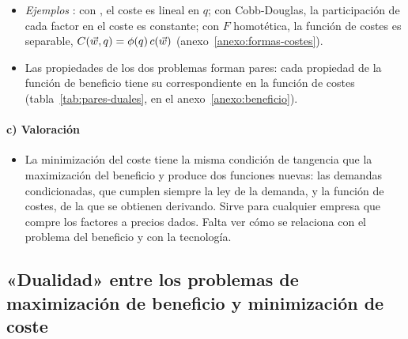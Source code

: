 \documentclass[11pt]{article}
\begin{document}
\begin{itemize}
\begin{enumerate}
\begin{itemize}
    \item tal que $S(\vect{w},q)\,\vect{w}=\vect{0}$, por la homogeneidad de grado cero de $\vect{z}(\vect{w},q)$ en $\vect{w}$ (teorema de ). Con dos factores, la consecuencia es que son necesariamente \emph{sustitutivos netos}: $\partial z_L(\vect{w},q)/\partial w_K\geq 0$.
    \end{itemize}
    Las demostraciones son las mismas que las de la función de gasto y la matriz de  .
  \end{enumerate}
\item \emph{Ejemplos} : con , el coste es lineal en $q$; con Cobb-Douglas, la participación de cada factor en el coste es constante; con $F$ homotética, la función de costes es separable, $C(\vec{w},q)=\phi(q)\,c(\vec{w})$ (anexo~\ref{anexo:formas-costes}).
\end{itemize}

\begin{itemize}
\item Las propiedades de los dos problemas forman pares: cada propiedad de la función de beneficio tiene su correspondiente en la función de costes (tabla~\ref{tab:pares-duales}, en el anexo~\ref{anexo:beneficio}).
\end{itemize}

\paragraph{c) Valoración}

\begin{itemize}
\item La minimización del coste tiene la misma condición de tangencia que la maximización del beneficio y produce dos funciones nuevas: las demandas condicionadas, que cumplen siempre la ley de la demanda, y la función de costes, de la que se obtienen derivando. Sirve para cualquier empresa que compre los factores a precios dados. Falta ver cómo se relaciona con el problema del beneficio y con la tecnología.
\end{itemize}

\subsection{«Dualidad» entre los problemas de maximización de beneficio\cortetitulo{} y minimización de coste}\label{sec:dualidad-problemas-maximizacion}
\end{document}
